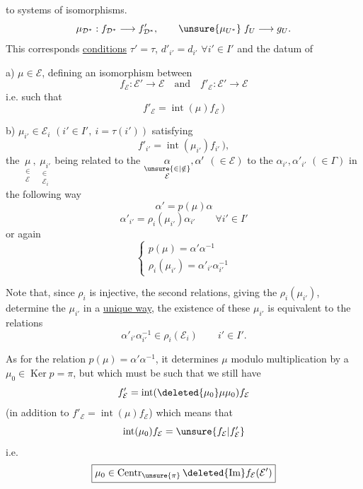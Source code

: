 
 to systems of isomorphisms.
\[
\mu_{\mathcal D^*}:f_{\mathcal D^*}\longrightarrow f'_{\mathcal D^*},\qquad
\unsure{\mu_{U^*}}\;f_U\longrightarrow g_U.
\]
This corresponds \uline{conditions} $\tau'=\tau$, $d'_{i'}=d_{i'}$ $\forall i'\in I'$ and  the datum of

a) $\boxed{\boxed{\mu\in\mathcal E}}$, defining an isomorphism between
\[
f_{\mathcal E}:\mathcal E'\longrightarrow\mathcal E
\quad\text{and}\quad
f'_{\mathcal E}:\mathcal E'\longrightarrow\mathcal E
\]
i.e.  such that
\[
\boxed{f'_{\mathcal E}=\operatorname{int}(\mu)f_{\mathcal E}}\,)
\]

b) $\boxed{\boxed{\mu_{i'}\in\mathcal E_i}}$ $(i'\in I',\ i=\tau(i'))$
satisfying
\[
\boxed{f'_{i'}=\operatorname{int}(\mu_{i'})f_{i'}}\,),
\]
the $\underset{\substack{\in\\\mathcal E}}{\mu},\ \underset{\substack{\in\\\mathcal E_i}}{\mu_{i'}}$ being related to the $\underset{\substack{\unsure{\in|\notin}\\\mathcal E}}{\alpha},\alpha'$  $(\in\mathcal E)$
to the $\alpha_{i'},\alpha'_{i'}$ $(\in\Gamma)$ in the following way
\[
\boxed{\alpha'=p(\mu)\alpha}
\]
\[
\boxed{\alpha'_{i'}=\rho_i(\mu_{i'})\alpha_{i'}}\qquad\forall i'\in I'
\]
or again
\[
\boxed{\begin{cases}
p(\mu)=\alpha'\alpha^{-1}\\
\rho_i(\mu_{i'})=\alpha'_{i'}\alpha_{i'}^{-1}
\end{cases}}
\]

Note that, since $\rho_i$ is injective, the second relations, giving the $\rho_i(\mu_{i'})$, determine the $\mu_{i'}$ in a \uline{unique way}, the existence of these $\mu_{i'}$ is equivalent to the relations
\[
\boxed{\alpha'_{i'}\alpha_{i'}^{-1}\in\rho_i(\mathcal E_i)}\qquad i'\in I'.
\]

As for the relation $p(\mu)=\alpha'\alpha^{-1}$, it determines $\mu$ modulo multiplication  by a  $\mu_0\in\operatorname{Ker}p=\pi$, but which must be such that we still have
\[
f'_{\mathcal E}=\operatorname{int}(\deleted{\mu_0}\mu\mu_0)f_{\mathcal E}
\]
(in addition to $f'_{\mathcal E}=\operatorname{int}(\mu)f_{\mathcal E}$) which means  that
\[
\operatorname{int}(\mu_0)f_{\mathcal E}=\unsure{f_{\mathcal E}|f'_{\mathcal E}}
\]
i.e.
\[
\boxed{\mu_0\in\operatorname{Centr}_{\unsure{\pi}}\deleted{\operatorname{Im}}f_{\mathcal E}(\mathcal E')}
\]


